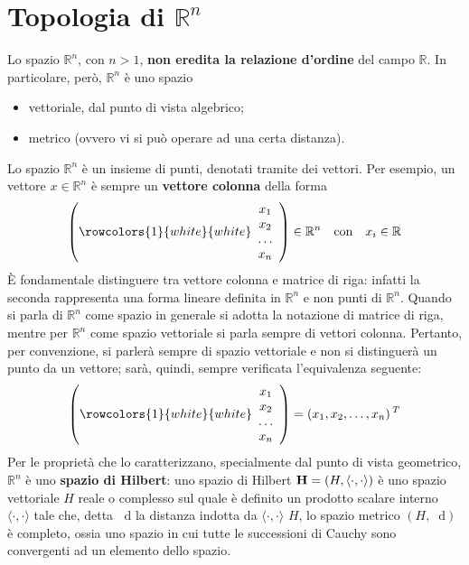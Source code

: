 \documentclass[a4paper]{extarticle}
\newcommand*\dif{\mathop{}\!\mathrm{d}}
\begin{document}
\section{Topologia di $\mathbb{R}^n$}
Lo spazio $\mathbb{R}^n$, con $n>1$, \textbf{non eredita la relazione d'ordine} del campo $\mathbb{R}$. In particolare, però, $\mathbb{R}^n$ è uno spazio
\begin{itemize}
    \item vettoriale, dal punto di vista algebrico;
    \item metrico (ovvero vi si può operare ad una certa distanza).
\end{itemize}
Lo spazio $\mathbb{R}^n$ è un insieme di punti, denotati tramite dei vettori. Per esempio, un vettore $x \in \mathbb{R}^n$ è sempre un \textbf{vettore colonna} della forma
\[
    \left(
        \rowcolors{1}{white}{white}
        \begin{array}{c}
            x_1\\
            x_2\\
            \dots\\
            x_n
        \end{array}
    \right)
    \in \mathbb{R}^n \hspace{1em} \text{con} \hspace{1em} x_i \in \mathbb{R}
\]
È fondamentale distinguere tra vettore colonna e matrice di riga: infatti la seconda rappresenta una forma lineare definita in $\mathbb{R}^n$ e non punti di $\mathbb{R}^n$. Quando si parla di $\mathbb{R}^n$ come spazio in generale si adotta la notazione di matrice di riga, mentre per $\mathbb{R}^n$ come spazio vettoriale si parla sempre di vettori colonna. Pertanto, per convenzione, si parlerà sempre di spazio vettoriale e non si distinguerà un punto da un vettore; sarà, quindi, sempre verificata l'equivalenza seguente:
\[
    \left(
        \rowcolors{1}{white}{white}
        \begin{array}{c}
            x_1\\
            x_2\\
            \dots\\
            x_n
        \end{array}
    \right)
    = \left(x_1, x_2, \dots, x_n\right){^T}
\]
Per le proprietà che lo caratterizzano, specialmente dal punto di vista geometrico, $\mathbb{R}^n$ è uno \textbf{spazio di Hilbert}: uno spazio di Hilbert ${\bf{H}} = (H,\left<\cdot,\cdot\right>)$ è uno spazio vettoriale $H$ reale o complesso sul quale è definito un prodotto scalare interno $\langle \cdot,\cdot \rangle$ tale che, detta $\dif$ la distanza indotta da $\langle \cdot ,\cdot \rangle$ $H$, lo spazio metrico $(H,\dif)$ è completo, ossia uno spazio in cui tutte le successioni di Cauchy sono convergenti ad un elemento dello spazio.
\end{document}
